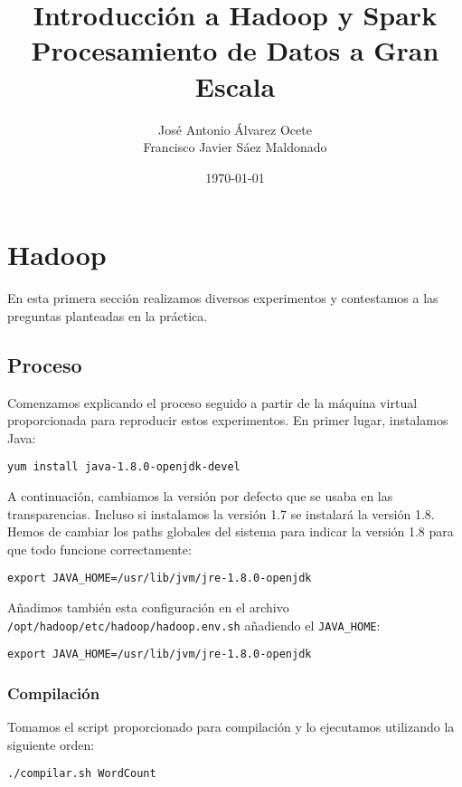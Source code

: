 \documentclass[11pt]{article}
\author{José Antonio Álvarez Ocete\\ Francisco Javier Sáez Maldonado}
\date{\today}
\title{Introducción a Hadoop y Spark\\\medskip
\large Procesamiento de Datos a Gran Escala}
\def\inline{\lstinline[basicstyle=\ttfamily,keywordstyle={}]}
\begin{document}
\maketitle

\tableofcontents

\section{Hadoop}

En esta primera sección realizamos diversos experimentos y contestamos a las preguntas planteadas en la práctica.

\subsection{Proceso}

Comenzamos explicando el proceso seguido a partir de la máquina virtual proporcionada para reproducir estos experimentos. En primer lugar, instalamos Java:

\begin{verbatim}
yum install java-1.8.0-openjdk-devel
\end{verbatim}

A continuación, cambiamos la versión por defecto que se usaba en las transparencias. Incluso si instalamos la versión 1.7 se instalará la versión 1.8. Hemos de cambiar los paths globales del sistema para indicar la versión 1.8 para que todo funcione correctamente:

\begin{verbatim}
export JAVA_HOME=/usr/lib/jvm/jre-1.8.0-openjdk
\end{verbatim}

Añadimos también esta configuración en el archivo \inline{/opt/hadoop/etc/hadoop/hadoop.env.sh} añadiendo el \inline{JAVA_HOME}:

\begin{verbatim}
export JAVA_HOME=/usr/lib/jvm/jre-1.8.0-openjdk
\end{verbatim}

\subsubsection*{ Compilación}

Tomamos el script proporcionado para compilación y lo ejecutamos utilizando la siguiente orden:

\begin{verbatim}
./compilar.sh WordCount
\end{verbatim}
\end{document}
